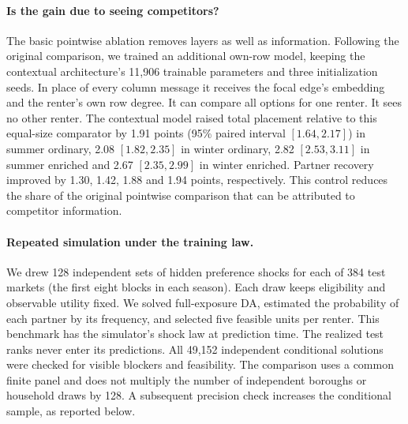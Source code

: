 \paragraph{Is the gain due to seeing competitors?}
The basic pointwise ablation removes layers as well as information. Following the original comparison, we trained an additional own-row model, keeping the contextual architecture's 11,906 trainable parameters and three initialization seeds. In place of every column message it receives the focal edge's embedding and the renter's own row degree. It can compare all options for one renter. It sees no other renter. The contextual model raised total placement relative to this equal-size comparator by 1.91 points (95\% paired interval $[1.64,2.17]$) in summer ordinary, 2.08 $[1.82,2.35]$ in winter ordinary, 2.82 $[2.53,3.11]$ in summer enriched and 2.67 $[2.35,2.99]$ in winter enriched. Partner recovery improved by 1.30, 1.42, 1.88 and 1.94 points, respectively. This control reduces the share of the original pointwise comparison that can be attributed to competitor information.

\paragraph{Repeated simulation under the training law.}
We drew 128 independent sets of hidden preference shocks for each of 384 test markets (the first eight blocks in each season). Each draw keeps eligibility and observable utility fixed. We solved full-exposure DA, estimated the probability of each partner by its frequency, and selected five feasible units per renter. This benchmark has the simulator's shock law at prediction time. The realized test ranks never enter its predictions. All 49,152 independent conditional solutions were checked for visible blockers and feasibility. The comparison uses a common finite panel and does not multiply the number of independent boroughs or household draws by 128. A subsequent precision check increases the conditional sample, as reported below.

